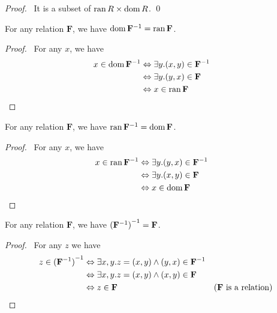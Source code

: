 \begin{proof}
    \pf\ It is a subset of $\operatorname{ran} R \times \operatorname{dom} R$. \qed
\end{proof}

\begin{theorem}
    \label{theorem:dom_inv}
    For any relation $\mathbf{F}$, we have $\operatorname{dom} {\mathbf{F}}^{-1} = \operatorname{ran} \mathbf{F}$.
\end{theorem}

\begin{proof}
    \pf\ For any $x$, we have
    \begin{align*}
        x \in \operatorname{dom} {\mathbf{F}}^{-1} & \Leftrightarrow \exists y. (x,y) \in {\mathbf{F}}^{-1} \\
        & \Leftrightarrow \exists y. (y,x) \in \mathbf{F} \\
        & \Leftrightarrow x \in \operatorname{ran} \mathbf{F} & \relax
    \end{align*}
\end{proof}

\begin{theorem}
    \label{theorem:ran_inv}
    For any relation $\mathbf{F}$, we have $\operatorname{ran} {\mathbf{F}}^{-1} = \operatorname{dom} \mathbf{F}$.
\end{theorem}

\begin{proof}
    \pf\ For any $x$, we have
    \begin{align*}
        x \in \operatorname{ran} {\mathbf{F}}^{-1} & \Leftrightarrow \exists y. (y,x) \in {\mathbf{F}}^{-1} \\
        & \Leftrightarrow \exists y. (x,y) \in \mathbf{F} \\
        & \Leftrightarrow x \in \operatorname{dom} \mathbf{F} & \relax
    \end{align*}
\end{proof}

\begin{theorem}
    \label{theorem:inv_inv}
    For any relation $\mathbf{F}$, we have ${({\mathbf{F}}^{-1})}^{-1} = \mathbf{F}$.
\end{theorem}

\begin{proof}
    \pf\ For any $z$ we have
    \begin{align*}
        z \in {(\ensuremath{{\mathbf{F}}^{-1}})}^{-1} & \Leftrightarrow \exists x, y. z = (x,y) \wedge (y,x) \in {\mathbf{F}}^{-1} \\
        & \Leftrightarrow \exists x,y. z = (x,y) \wedge (x,y) \in \mathbf{F} \\
        & \Leftrightarrow z \in \mathbf{F} & (\text{$\mathbf{F}$ is a relation}) \relax
    \end{align*}
\end{proof}

